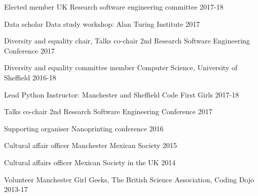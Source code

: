 \begin{cvpress}
\cvpres
{Elected member} %
{UK Research software engineering committee} %
{2017-18} %

\cvpres
{Data scholar} %
{Data study workshop: Alan Turing Institute} %
{2017} %


\cvpres
{Diversity and equality chair, Talks co-chair} %
{2nd Research Software Engineering Conference} %
{2017} %


\cvpres
{Diversity and equality committee member} %
{Computer Science, University of Sheffield} %
{2016-18} %


\cvpres
{Lead Python Instructor: Manchester and Sheffield} %
{Code First Girls} %
{2017-18} %


\cvpres
{Talks co-chair} %
{2nd Research Software Engineering Conference} %
{2017} %
    

\cvpres
{Supporting organiser} %
{Nanoprinting conference} %
{2016} %


\cvpres
{Cultural affair officer}
{Manchester Mexican Society}
{2015}

\cvpres
{Cultural affairs officer}
{Mexican Society in the UK}
{2014}


\cvpres
{Volunteer} %
{Manchester Girl Geeks, The British Science Association, Coding Dojo} %
{2013-17} %


\end{cvpress}